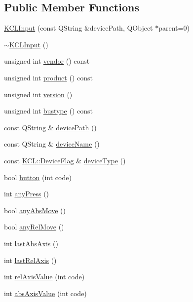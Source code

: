 \subsection*{Public Member Functions}
\begin{CompactItemize}
\item 
\hyperlink{class_k_c_l_input_27a074543e1f0f6d0ce92a40bceed684}{KCLInput} (const QString \&devicePath, QObject $\ast$parent=0)
\item 
\hyperlink{class_k_c_l_input_aea38929accc31d9f27c08b5d4119fe3}{$\sim$KCLInput} ()
\item 
unsigned int \hyperlink{class_k_c_l_input_5919b85a4f70f9d573dfea5b797fbe85}{vendor} () const 
\item 
unsigned int \hyperlink{class_k_c_l_input_024e32ca1e69548cf8c88f9cdf0c846a}{product} () const 
\item 
unsigned int \hyperlink{class_k_c_l_input_53ebfb56b5039bdeb8b6bed4bbff1b0e}{version} ()
\item 
unsigned int \hyperlink{class_k_c_l_input_a10bb61e06d513fdf233a5b674c1d800}{bustype} () const 
\item 
const QString \& \hyperlink{class_k_c_l_input_7eed3b9f99f3ee3634693bcbe385329b}{devicePath} ()
\item 
const QString \& \hyperlink{class_k_c_l_input_cdb5cd70b2c5752586e99f6bc7508e2f}{deviceName} ()
\item 
const \hyperlink{class_k_c_l_a8029324d980fcc0db841345b9c005b7}{KCL::DeviceFlag} \& \hyperlink{class_k_c_l_input_cd334fdeddab9e5ae026e22942ebac65}{deviceType} ()
\item 
bool \hyperlink{class_k_c_l_input_afe120b671d76b4b7d14b48e03d4faf6}{button} (int code)
\item 
int \hyperlink{class_k_c_l_input_9489641a8f669dc73ee86120a6e02adc}{anyPress} ()
\item 
bool \hyperlink{class_k_c_l_input_addbe22e22824c19e38deedfb603ee6c}{anyAbsMove} ()
\item 
bool \hyperlink{class_k_c_l_input_c7eb85203b40fc1fd3d6ac65788b79b4}{anyRelMove} ()
\item 
int \hyperlink{class_k_c_l_input_c5a8a2c8264e7ff8d4567057d2ae12c5}{lastAbsAxis} ()
\item 
int \hyperlink{class_k_c_l_input_8414ad0259d97aed6a00658b7dd94d45}{lastRelAxis} ()
\item 
int \hyperlink{class_k_c_l_input_9c10138f6d7b8f744f352cc4372ffa25}{relAxisValue} (int code)
\item 
int \hyperlink{class_k_c_l_input_10f2230a1908c09ffa752052e60a21d9}{absAxisValue} (int code)

\end{CompactItemize}
